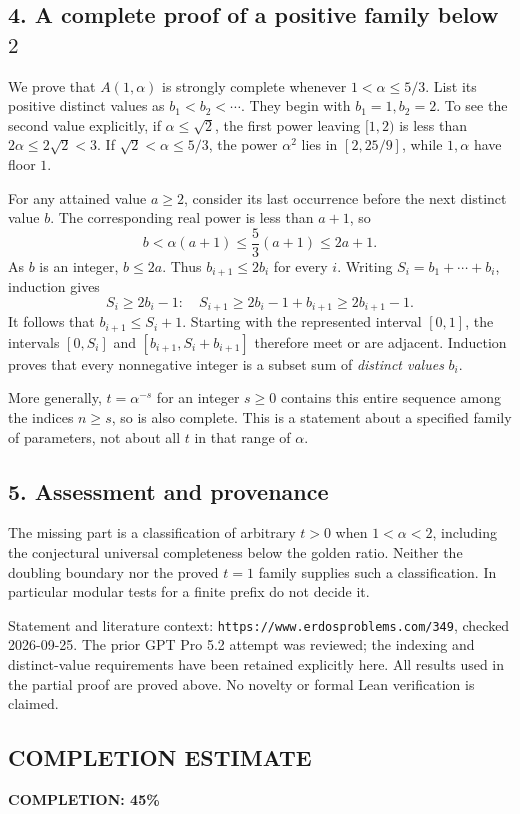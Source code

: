 \subsection*{4. A complete proof of a positive family below $2$}
We prove that $A(1,\alpha)$ is strongly complete whenever
$1<\alpha\le5/3$. List its positive distinct values as
$b_1<b_2<\cdots$. They begin with $b_1=1,b_2=2$.
To see the second value explicitly, if $\alpha\le\sqrt2$, the first
power leaving $[1,2)$ is less than $2\alpha\le2\sqrt2<3$.
If $\sqrt2<\alpha\le5/3$, the power $\alpha^2$ lies in $[2,25/9]$,
while $1,\alpha$ have floor $1$.

For any attained value $a\ge2$, consider its last occurrence before
the next distinct value $b$. The corresponding real power is less
than $a+1$, so
\[
 b<\alpha(a+1)\le \frac53(a+1)\le2a+1.
\]
As $b$ is an integer, $b\le2a$. Thus $b_{i+1}\le2b_i$ for every $i$.
Writing $S_i=b_1+\cdots+b_i$, induction gives
\[
 S_i\ge2b_i-1:
 \quad S_{i+1}\ge2b_i-1+b_{i+1}\ge2b_{i+1}-1.
\]
It follows that $b_{i+1}\le S_i+1$. Starting with the represented
interval $[0,1]$, the intervals $[0,S_i]$ and
$[b_{i+1},S_i+b_{i+1}]$ therefore meet or are adjacent.
Induction proves that every nonnegative integer is a subset sum of
\emph{distinct values} $b_i$.

More generally, $t=\alpha^{-s}$ for an integer $s\ge0$ contains this
entire sequence among the indices $n\ge s$, so is also complete.
This is a statement about a specified family of parameters, not about
all $t$ in that range of $\alpha$.

\subsection*{5. Assessment and provenance}
The missing part is a classification of arbitrary $t>0$ when
$1<\alpha<2$, including the conjectural universal completeness below
the golden ratio. Neither the doubling boundary nor the proved
$t=1$ family supplies such a classification. In particular modular
tests for a finite prefix do not decide it.

Statement and literature context:
\texttt{https://www.erdosproblems.com/349}, checked 2026-09-25.
The prior GPT Pro 5.2 attempt was reviewed; the indexing and
distinct-value requirements have been retained explicitly here.
All results used in the partial proof are proved above.
No novelty or formal Lean verification is claimed.
\subsection*{COMPLETION ESTIMATE}
\textbf{COMPLETION: 45\%}
